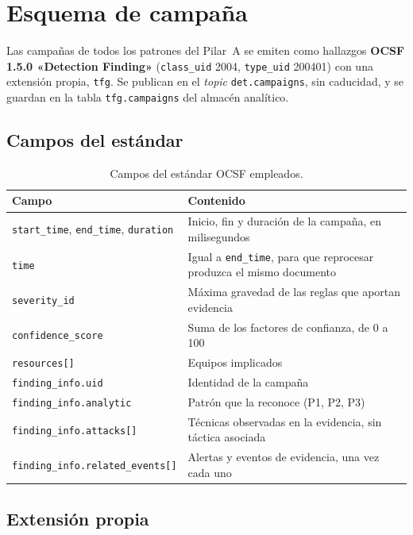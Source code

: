 \chapter{Esquema de campaña}
\label{anx:esquema}

Las campañas de todos los patrones del Pilar~A se emiten como hallazgos \textbf{OCSF 1.5.0
«Detection Finding»} (\texttt{class\_uid} 2004, \texttt{type\_uid} 200401) con una extensión
propia, \texttt{tfg}. Se publican en el \textit{topic} \texttt{det.campaigns}, sin caducidad,
y se guardan en la tabla \texttt{tfg.campaigns} del almacén analítico.

\section{Campos del estándar}

\begin{table}[H]
\centering
\small
\begin{tabular}{|l|p{8.2cm}|}
\hline
\textbf{Campo} & \textbf{Contenido} \\
\hline
\texttt{start\_time}, \texttt{end\_time}, \texttt{duration} & Inicio, fin y duración de la campaña, en milisegundos \\
\texttt{time} & Igual a \texttt{end\_time}, para que reprocesar produzca el mismo documento \\
\texttt{severity\_id} & Máxima gravedad de las reglas que aportan evidencia \\
\texttt{confidence\_score} & Suma de los factores de confianza, de 0 a 100 \\
\texttt{resources[]} & Equipos implicados \\
\texttt{finding\_info.uid} & Identidad de la campaña \\
\texttt{finding\_info.analytic} & Patrón que la reconoce (P1, P2, P3) \\
\texttt{finding\_info.attacks[]} & Técnicas observadas en la evidencia, sin táctica asociada \\
\texttt{finding\_info.related\_events[]} & Alertas y eventos de evidencia, una vez cada uno \\
\hline
\end{tabular}
\caption{Campos del estándar OCSF empleados.}
\end{table}

\section{Extensión propia}

